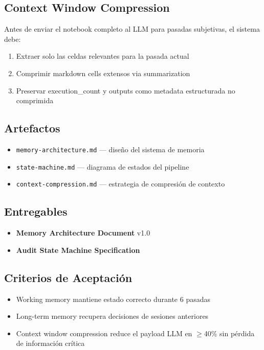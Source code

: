\documentclass[12pt,a4paper]{article}
\begin{document}
\subsection*{Context Window Compression}
Antes de enviar el notebook completo al LLM para pasadas subjetivas, el sistema debe:
\begin{enumerate}
  \item Extraer solo las celdas relevantes para la pasada actual
  \item Comprimir markdown cells extensos via summarization
  \item Preservar execution\_count y outputs como metadata estructurada no comprimida
\end{enumerate}

\subsection*{Artefactos}
\begin{itemize}
  \item \texttt{memory-architecture.md} --- diseño del sistema de memoria
  \item \texttt{state-machine.md} --- diagrama de estados del pipeline
  \item \texttt{context-compression.md} --- estrategia de compresión de contexto
\end{itemize}

\subsection*{Entregables}
\begin{itemize}
  \item \textbf{Memory Architecture Document} v1.0
  \item \textbf{Audit State Machine Specification}
\end{itemize}

\subsection*{Criterios de Aceptación}
\begin{itemize}
  \item[{${[\;]}$}] Working memory mantiene estado correcto durante 6 pasadas
  \item[{${[\;]}$}] Long-term memory recupera decisiones de sesiones anteriores
  \item[{${[\;]}$}] Context window compression reduce el payload LLM en $\geq$40\% sin pérdida de información crítica
\end{itemize}
\end{document}
